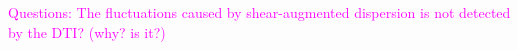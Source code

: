 \documentclass[12pt,a4paper]{article}
\newcommand{\lars}[1]{\textcolor{magenta}{#1}}
\begin{document}
\lars{ Questions:
The fluctuations caused by shear-augmented dispersion is not detected by the DTI?  (why? is it?) }


  
%
%
%
%
%
%
\end{document}
